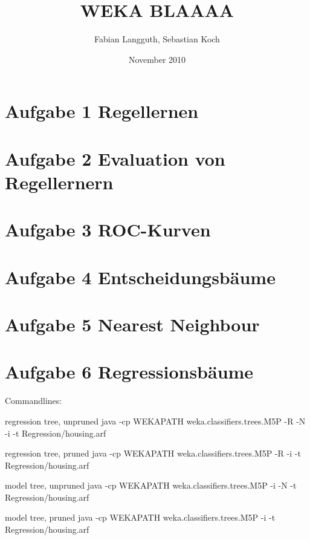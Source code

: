 


\areaset[66pt]{415pt}{600pt}



\title{WEKA BLAAAA}
\author{Fabian Langguth, Sebastian Koch}
\date{November 2010}

\maketitle

\section{Aufgabe 1 Regellernen} 

\newpage

\section{Aufgabe 2 Evaluation von Regellernern}

\newpage

\section{Aufgabe 3 ROC-Kurven}

\newpage
\section{Aufgabe 4 Entscheidungsb\"aume}

\newpage
\section{Aufgabe 5 Nearest Neighbour}

\newpage
\section{Aufgabe 6 Regressionsb\"aume}
\label{sec:aufgabe_6_regressionsbaume}

Commandlines: 

regression tree, unpruned
java -cp WEKAPATH weka.classifiers.trees.M5P -R -N -i -t Regression/housing.arf

regression tree, pruned
java -cp WEKAPATH weka.classifiers.trees.M5P -R -i -t Regression/housing.arf

model tree, unpruned
java -cp WEKAPATH weka.classifiers.trees.M5P -i -N -t Regression/housing.arf

model tree, pruned
java -cp WEKAPATH weka.classifiers.trees.M5P -i -t Regression/housing.arf


